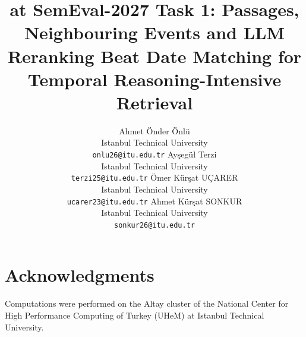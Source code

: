 \documentclass[11pt]{article}
\title{\sys at SemEval-2027 Task 1: Passages, Neighbouring Events and LLM Reranking
       Beat Date Matching for Temporal Reasoning-Intensive Retrieval}
\author{Ahmet \"{O}nder \"{O}nl\"{u} \\
  Istanbul Technical University \\
  \texttt{onlu26@itu.edu.tr} \And
  Ay\c{s}eg\"{u}l Terzi \\
  Istanbul Technical University \\
  \texttt{terzi25@itu.edu.tr} \AND
  \"{O}mer K\"{u}r\c{s}at U\c{C}ARER \\
  Istanbul Technical University \\
  \texttt{ucarer23@itu.edu.tr} \And
  Ahmet K\"{u}r\c{s}at SONKUR \\
  Istanbul Technical University \\
  \texttt{sonkur26@itu.edu.tr}}
\begin{document}
\setlength\titlebox{6.5cm}
\maketitle










\section*{Acknowledgments}
Computations were performed on the Altay cluster of the National Center for High Performance
Computing of Turkey (UHeM) at Istanbul Technical University.



\appendix

\end{document}
